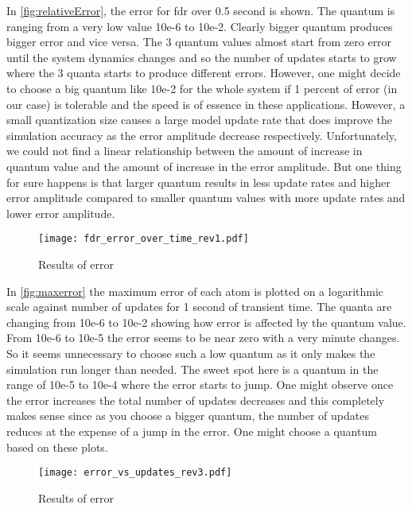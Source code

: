 \documentclass{scspaperproc}
\theoremstyle{scsthe}
\begin{document}
In \autoref{fig:relativeError}, the error for fdr over 0.5 second is shown. The quantum is ranging from a very low value 10e-6 to 10e-2. Clearly bigger quantum produces bigger error and vice versa. The 3 quantum values almost start from zero error until the system dynamics changes and so the number of updates starts to grow where the 3 quanta starts to produce different errors. However, one might decide to choose a big quantum like 10e-2 for the whole system if 1 percent of error (in our case) is tolerable and the speed is of essence in these applications. However, a small quantization size causes a large model update rate that does improve the simulation accuracy as the error amplitude decrease respectively. Unfortunately, we could not find a linear relationship between the amount of increase in quantum value and the amount of increase in the error amplitude. But one thing for sure happens is that larger quantum results in less update rates and higher error amplitude compared to smaller quantum values with more update rates and lower error amplitude.

\begin{figure}[H]
 \FloatBarrier
    \centering
    \texttt{[image: fdr\_error\_over\_time\_rev1.pdf]}
    \caption{Results of error}
    \label{fig:relativeError}
\end{figure}

In \autoref{fig:maxerror} the maximum error of each atom is plotted on a logarithmic scale against number of updates for 1 second of transient time. The quanta are changing from 10e-6 to 10e-2 showing how error is affected by the quantum value. From 10e-6 to 10e-5 the error seems to be near zero with a very minute changes. So it seems unnecessary to choose such a low quantum as it only makes the simulation run longer than needed. The sweet spot here is a quantum in the range of 10e-5 to 10e-4 where the error starts to jump. One might observe once the error increases the total number of updates decreases and this completely makes sense since as you choose a bigger quantum, the number of updates reduces at the expense of a jump in the error. One might choose a quantum based on these plots. 

\begin{figure}[H]
  \FloatBarrier
    \centering
    \texttt{[image: error\_vs\_updates\_rev3.pdf]}
    \caption{Results of error}
    \label{fig:maxerror}
\end{figure}
\end{document}

